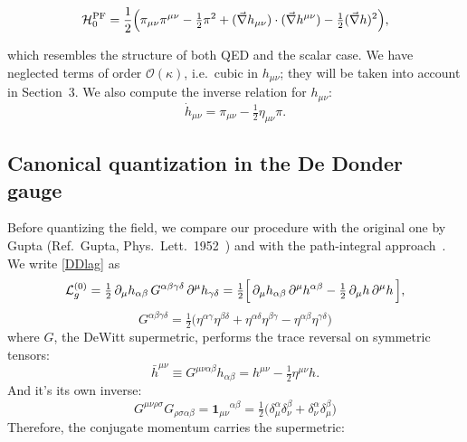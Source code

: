 \documentclass[12pt,a4paper,oneside]{article}
\numberwithin{equation}{section}   %
\begin{document}
\begin{equation}
\mathcal{H}_0^{\mathrm{PF}}=\frac{1}{2}\Bigl(\pi_{\mu\nu}\pi^{\mu\nu}-\tfrac12\pi^2
+(\vec\nabla h_{\mu\nu})\cdot(\vec\nabla h^{\mu\nu})-\tfrac12(\vec\nabla h)^2\Bigr),
\label{HPF}
\end{equation}

which resembles the structure of both QED and the scalar case.
We have neglected terms of order $\mathcal{O}(\kappa)$, i.e.\ cubic in
$h_{\mu\nu}$; they will be taken into account in Section~3.
We also compute the inverse relation for $h_{\mu\nu}$:
\begin{equation}
\dot h_{\mu\nu}=\pi_{\mu\nu}-\tfrac12\eta_{\mu\nu}\pi .
\end{equation}

\subsection{Canonical quantization in the De Donder gauge}

Before quantizing the field, we compare our procedure with the original one by
Gupta (Ref.\ Gupta, Phys.\ Lett.\ 1952~\cite{Gupta1952}) and with the path-integral approach~\cite{Feynman1963,DeWitt1967II,DeWitt1967III}.
We write \eqref{DDlag} as
\begin{equation}
  \mathcal{L}^{(0)}_g
  = \tfrac{1}{2}\, \partial_\mu h_{\alpha\beta}\, G^{\alpha\beta\gamma\delta}\,
    \partial^\mu h_{\gamma\delta}
  = \tfrac{1}{2}\Bigl[\, \partial_\mu h_{\alpha\beta}\,\partial^\mu h^{\alpha\beta}
    - \tfrac{1}{2}\, \partial_\mu h\, \partial^\mu h \,\Bigr],
\end{equation}
\begin{equation}
\boxed{
  G^{\alpha\beta\gamma\delta}
  = \tfrac{1}{2}\bigl(\eta^{\alpha\gamma}\eta^{\beta\delta}
    + \eta^{\alpha\delta}\eta^{\beta\gamma}
    - \eta^{\alpha\beta}\eta^{\gamma\delta}\bigr)
}
\label{eq:G}
\end{equation}
where $G$, the DeWitt supermetric, performs the trace reversal on symmetric 
tensors:
\begin{equation}
  \bar{h}^{\mu\nu} \equiv G^{\mu\nu\alpha\beta} h_{\alpha\beta}
  = h^{\mu\nu} - \tfrac{1}{2}\eta^{\mu\nu} h .
\end{equation}
And it's its own inverse:
\begin{equation}
  G^{\mu\nu\rho\sigma}G_{\rho\sigma\alpha\beta}
  = \mathbf{1}_{\mu\nu}{}^{\alpha\beta}
  = \tfrac{1}{2}\bigl(\delta^{\alpha}_{\mu}\delta^{\beta}_{\nu}
                    + \delta^{\alpha}_{\nu}\delta^{\beta}_{\mu}\bigr)
\end{equation}
Therefore, the conjugate momentum carries the supermetric:
\end{document}

